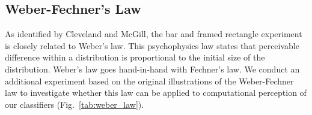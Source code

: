 \subsection{Weber-Fechner's Law}

As identified by Cleveland and McGill, the bar and framed rectangle experiment is closely related to Weber's law. This psychophysics law states that perceivable difference within a distribution is proportional to the initial size of the distribution. Weber's law goes hand-in-hand with Fechner's law. We conduct an additional experiment based on the original illustrations of the Weber-Fechner law to investigate whether this law can be applied to computational perception of our classifiers (Fig.~\ref{tab:weber_law}).

